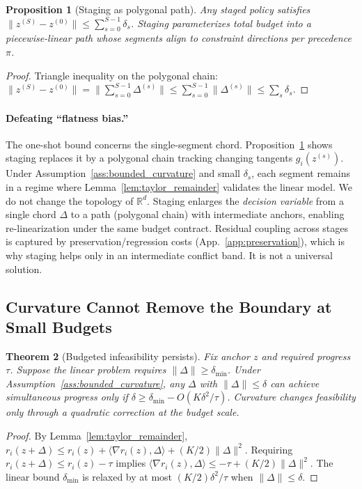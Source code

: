 \documentclass{article}
\theoremstyle{plain}
\newtheorem{theorem}{Theorem}[section]
\newtheorem{proposition}[theorem]{Proposition}
\theoremstyle{definition}
\theoremstyle{remark}
\newcommand{\appref}[1]{App.~\ref{#1}}
\begin{document}
\begin{proposition}[Staging as polygonal path]
\label{prop:polygonal}
Any staged policy satisfies $\|z^{(S)}-z^{(0)}\| \le \sum_{s=0}^{S-1}\delta_s$.
Staging parameterizes total budget into a piecewise-linear path whose segments align to constraint directions per precedence $\pi$.
\end{proposition}
\begin{proof}
Triangle inequality on the polygonal chain: $\|z^{(S)}-z^{(0)}\| = \|\sum_{s=0}^{S-1}\Delta^{(s)}\| \le \sum_{s=0}^{S-1}\|\Delta^{(s)}\| \le \sum_{s}\delta_s$.
\end{proof}

\paragraph{Defeating ``flatness bias.''}
The one-shot bound concerns the single-segment chord. Proposition~\ref{prop:polygonal} shows staging replaces it by a polygonal chain tracking changing tangents $g_i(z^{(s)})$. Under Assumption~\ref{ass:bounded_curvature} and small $\delta_s$, each segment remains in a regime where Lemma~\ref{lem:taylor_remainder} validates the linear model.
We do not change the topology of $\mathbb{R}^d$. Staging enlarges the \emph{decision variable} from a single chord $\Delta$ to a path (polygonal chain) with intermediate anchors, enabling re-linearization under the same budget contract.
Residual coupling across stages is captured by preservation/regression costs (\appref{app:preservation}), which is why staging helps only in an intermediate conflict band. It is not a universal solution.

\subsection{Curvature Cannot Remove the Boundary at Small Budgets}

\begin{theorem}[Budgeted infeasibility persists]
\label{thm:curvature_does_not_save}
Fix anchor $z$ and required progress $\tau$. Suppose the linear problem requires $\|\Delta\| \ge \delta_{\min}$.
Under Assumption~\ref{ass:bounded_curvature}, any $\Delta$ with $\|\Delta\|\le \delta$ can achieve simultaneous progress only if $\delta \ge \delta_{\min} - O(K\delta^2/\tau)$.
Curvature changes feasibility only through a quadratic correction at the budget scale.
\end{theorem}
\begin{proof}
By Lemma~\ref{lem:taylor_remainder}, $r_i(z+\Delta) \le r_i(z) + \langle\nabla r_i(z),\Delta\rangle + (K/2)\|\Delta\|^2$. Requiring $r_i(z+\Delta) \le r_i(z) - \tau$ implies $\langle\nabla r_i(z),\Delta\rangle \le -\tau + (K/2)\|\Delta\|^2$. The linear bound $\delta_{\min}$ is relaxed by at most $(K/2)\delta^2/\tau$ when $\|\Delta\| \le \delta$.
\end{proof}
\end{document}
